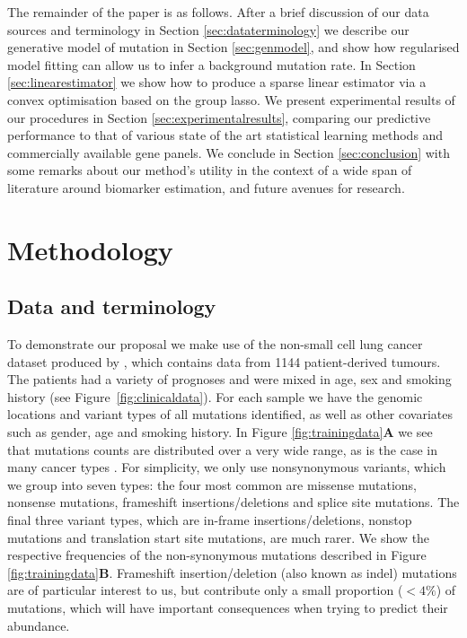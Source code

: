 \documentclass[10pt,twoside,openright]{report}
\begin{document}
The remainder of the paper is as follows. After a brief discussion of our data sources and terminology in Section \ref{sec:dataterminology} we describe our generative model of mutation in Section \ref{sec:genmodel}, and show how regularised model fitting can allow us to infer a background mutation rate. In Section \ref{sec:linearestimator} we show how to produce a sparse linear estimator via a convex optimisation based on the group \acrshort{lasso}. We present experimental results of our procedures in Section \ref{sec:experimentalresults}, comparing our predictive performance to that of various state of the art statistical learning methods and commercially available gene panels.
We conclude in Section \ref{sec:conclusion} with some remarks about our method's utility in the context of a wide span of literature around biomarker estimation, and future avenues for research. 



\section{Methodology}
\subsection{Data and terminology \label{sec:dataterminology}}
To demonstrate our proposal we make use of the non-small cell lung cancer dataset produced by \citet{campbell_distinct_2016}, which contains data from 1144 patient-derived tumours. The patients had a variety of prognoses and were mixed in age, sex and smoking history (see Figure~\ref{fig:clinicaldata}). For each sample we have the genomic locations and variant types of all mutations identified, as well as other covariates such as gender, age and smoking history. In Figure \ref{fig:trainingdata}\textbf{A} we see that mutations counts are distributed over a very wide range, as is the case in many cancer types \citep{chalmers_analysis_2017}. For simplicity, we only use nonsynonymous variants, which we group into seven types: the four most common are missense mutations, nonsense mutations, frameshift insertions/deletions and splice site mutations. The final three variant types, which are in-frame insertions/deletions, nonstop mutations and translation start site mutations, are much rarer. We show the respective frequencies of the non-synonymous mutations described in Figure \ref{fig:trainingdata}\textbf{B}. Frameshift insertion/deletion (also known as indel) mutations are of particular interest to us, but contribute only a small proportion ($<4\%$) of mutations, which will have important consequences when trying to predict their abundance. 
\end{document}
